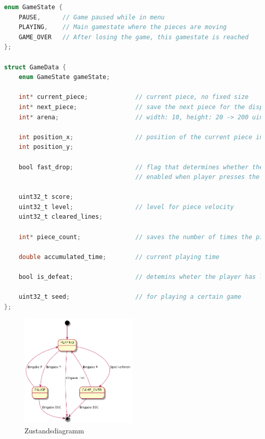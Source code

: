 \documentclass[11pt]{article}
\begin{document}
\begin{lstlisting}[language=C]
enum GameState {
    PAUSE,      // Game paused while in menu
    PLAYING,    // Main gamestate where the pieces are moving
    GAME_OVER   // After losing the game, this gamestate is reached
};

struct GameData {
    enum GameState gameState;

    int* current_piece;             // current piece, no fixed size
    int* next_piece;                // save the next piece for the display
    int* arena;                     // width: 10, height: 20 -> 200 uints

    int position_x;                 // position of the current piece inside the arena
    int position_y;

    bool fast_drop;                 // flag that determines whether the pieces move slow or fast downwards
                                    // enabled when player presses the down button

    uint32_t score;
    uint32_t level;                 // level for piece velocity
    uint32_t cleared_lines;

    int* piece_count;               // saves the number of times the piece have shown up

    double accumulated_time;        // current playing time

    bool is_defeat;                 // detemins wheter the player has lost

    uint32_t seed;                  // for playing a certain game
};

\end{lstlisting}

\begin{figure}[h]
  \centering
  \includegraphics[width=0.5\textwidth]{../state.png}
  \caption{Zustandsdiagramm}
\end{figure}
\end{document}
